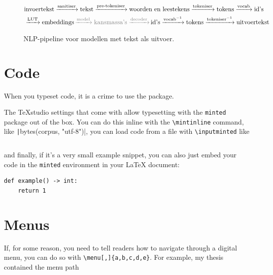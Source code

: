 


\begin{figure}[h]
	\begin{mdframed}[backgroundcolor=black!5, innertopmargin=-0.6em]
	\begin{adjustwidth}{0cm}{-1cm}
			\begin{equation*}\begin{aligned}
			&\text{invoertekst} \xrightarrow{\text{sanitiser}} \text{tekst} \xrightarrow{\text{pre-tokeniser}} \text{woorden en leestekens} \xrightarrow{\text{tokeniser}} \text{tokens} \xrightarrow{\text{vocab}} \text{id's} \\ &\xrightarrow{\text{LUT}} \text{embeddings} {\color{gray} \,\xrightarrow{\text{model}} \text{kansmassa's} \xrightarrow{\text{decoder}}\, } \text{id's} \xrightarrow{\text{vocab}^{-1}} \text{tokens} \xrightarrow{\text{tokeniser}^{-1}} \text{uitvoertekst}
		\end{aligned}\end{equation*}
	\end{adjustwidth}
	\end{mdframed}
	\caption{NLP-pipeline voor modellen met tekst als uitvoer.}
	\label{fig:pipeline}
\end{figure}


\section{Code}
When you typeset code, it is a crime to use the  package.

The \TeX{}studio settings that come with \repo allow typesetting with the \verb|minted| package out of the box. You can do this inline with the \verb|\mintinline| command, like \texttt|bytes(corpus, "utf-8")|, you can load code from a file with \verb|\inputminted| like
\inputminted[linenos]{python}{./res/code/hello.py}

and finally, if it's a very small example snippet, you can also just embed your code in the \verb|minted| environment in your \LaTeX{} document:
\begin{verbatim}
def example() -> int:
    return 1
\end{verbatim}

\section{Menus}
If, for some reason, you need to tell readers how to navigate through a digital menu, you can do so with \verb|\menu[,]{a,b,c,d,e}|. For example, my thesis contained the menu path

